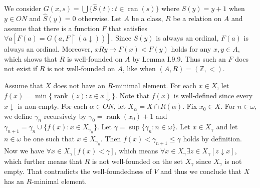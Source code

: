 \documentclass[12pt]{article}
\newcommand{\ran}{\mathop{\mathrm{ran}}}
\newcommand{\rank}{\mathop{\mathrm{rank}}}
\theoremstyle{definition}
\newenvironment{customthm}[1]
  {\renewcommand\theinnercustomthm{#1}\innercustomthm}
  {\endinnercustomthm}
\begin{document}
\begin{customthm}{I.9.50}
  We consider $G(x,s)=\bigcup\{\hat{S}(t):t\in\ran(s)\}$ where $\hat{S}(y)=y+1$ when $y\in ON$ and $\hat{S}(y)=0$ otherwise. Let $A$ be a class, $R$ be a relation on $A$ and assume that there is a function $F$ that satisfies $\forall a[F(a)=G(a,F\upharpoonright(a\downarrow))]$. Since $S(y)$ is always an ordinal, $F(a)$ is always an ordinal. Moreover, $xRy\rightarrow F(x)<F(y)$ holds for any $x,y\in A$, which shows that $R$ is well-founded on $A$ by Lemma I.9.9. Thus such an $F$ does not exist if $R$ is not well-founded on $A$, like when $(A,R)=(\mathbb{Z},<)$.
\end{customthm}

\begin{customthm}{I.9.51}
  Assume that $X$ does not have an $R$-minimal element. For each $x\in X$, let $f(x)=\min\{\rank(z):z\in x\downarrow\}$. Note that $f(x)$ is well-defined since every $x\downarrow$ is non-empty. For each $\alpha\in ON$, let $X_\alpha=X\cap R(\alpha)$. Fix $x_0\in X$. For $n\in\omega$, we define $\gamma_n$ recursively by $\gamma_0=\rank(x_0)+1$ and $\gamma_{n+1}=\gamma_n\cup\{f(x):x\in X_{\gamma_n}\}$. Let $\gamma=\sup\{\gamma_n:n\in\omega\}$. Let $x\in X_\gamma$ and let $n\in\omega$ be one such that $x\in X_{\gamma_n}$. Then $f(x)<\gamma_{n+1}\leq\gamma$ holds by definition. Now we have $\forall x\in X_\gamma[f(x)<\gamma]$, which means $\forall x\in X_\gamma\exists z\in X_\gamma[z\downarrow x]$, which further means that $R$ is not well-founded on the set $X_\gamma$ since $X_\gamma$ is not empty. That contradicts the well-foundedness of $V$ and thus we conclude that $X$ has an $R$-minimal element.
\end{customthm}
\end{document}
